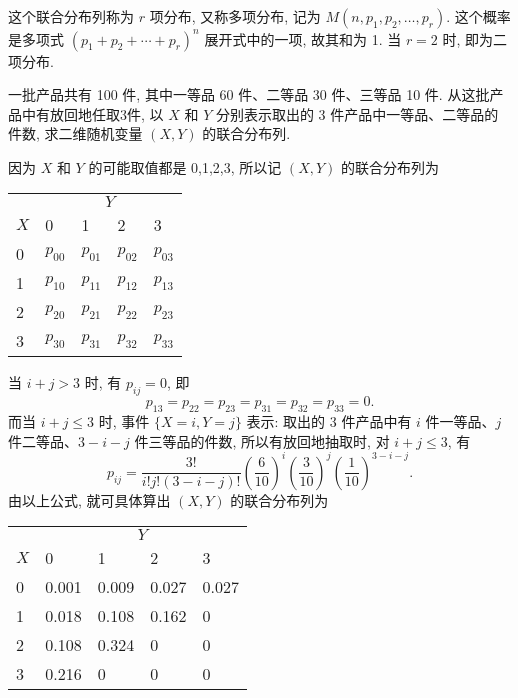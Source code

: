   这个联合分布列称为 $r$ 项分布, 又称多项分布, 记为 $M(n,p_1,p_2,\ldots,p_r)$. 这个概率
  是多项式 $(p_1+p_2+\cdots+p_r)^n$ 展开式中的一项, 故其和为 1. 当 $r=2$ 时, 即为二项分布.
  \begin{example}\label{exam:3.1.4}
    一批产品共有 100 件, 其中一等品 60 件、二等品 30 件、三等品 10 件. 
    从这批产品中有放回地任取3件, 以 $X$ 和 $Y$ 分别表示取出的 3 件产品中一等品、二等品的件数, 求二维随机变量 $(X,Y)$ 的联合分布列.
  \end{example}
  \begin{solution}
    因为 $X$ 和 $Y$ 的可能取值都是 0,1,2,3, 所以记 $(X,Y)$ 的联合分布列为
    \begin{center}
      \begin{tabularx}{0.8\textwidth}{ZZZZZ}
        \toprule
          &  \\
        $X$ & 0&  1&  2&  3 \\
        &  $p_{00}$& $p_{01}$& $p_{02}$& $p_{03}$\\
        &  $p_{10}$& $p_{11}$& $p_{12}$& $p_{13}$\\
        &  $p_{20}$& $p_{21}$& $p_{22}$& $p_{23}$\\
        &  $p_{30}$& $p_{31}$& $p_{32}$& $p_{33}$\\
        \bottomrule
      \end{tabularx}
    \end{center}
    当 $i+j>3$ 时, 有 $p_{ij}=0$, 即
    \[
      p_{13}=p_{22}=p_{23}=p_{31}=p_{32}=p_{33}=0.
    \]
    而当 $i+j\leq 3$ 时, 事件 $\{X=i,Y=j\}$ 表示: 取出的 3 件产品中有 $i$ 件一等品、$j$ 件二等品、$3-i-j$ 件三等品的件数, 
    所以有放回地抽取时, 对 $i+j\leq 3$, 有
    \[
      p_{i j}=\frac{3 !}{i ! j !(3-i-j) !}\left(\frac{6}{10}\right)^{i}\left(\frac{3}{10}\right)^{j}\left(\frac{1}{10}\right)^{3-i-j}.
    \]
    由以上公式, 就可具体算出 $(X,Y)$ 的联合分布列为
    \begin{center}
      \begin{tabularx}{0.8\textwidth}{ZZZZZ}
        \toprule
          &  \\
        $X$ & 0&  1&  2&  3 \\
        &  0.001   & 0.009   & 0.027   & 0.027   \\
        &  0.018   & 0.108   & 0.162   & 0       \\
        &  0.108   & 0.324   & 0       & 0       \\
        &  0.216   & 0       & 0       & 0       \\
        \bottomrule
      \end{tabularx}
    \end{center}
  \end{solution}
